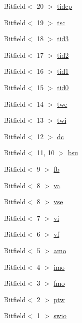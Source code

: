 \begin{DoxyCompactItemize}
\item 
Bitfield$<$ 20 $>$ \hyperlink{namespaceArmISA_a684303242e2beae8a4046dca91e1df6b}{tidcp}
\item 
Bitfield$<$ 19 $>$ \hyperlink{namespaceArmISA_a5a008ae3ad3257e839dc31ba7bdc1df7}{tsc}
\item 
Bitfield$<$ 18 $>$ \hyperlink{namespaceArmISA_aa514bf6204c77beeed1d6f468b8865f7}{tid3}
\item 
Bitfield$<$ 17 $>$ \hyperlink{namespaceArmISA_aebbc67d7831a7b50b370258ac57ad317}{tid2}
\item 
Bitfield$<$ 16 $>$ \hyperlink{namespaceArmISA_aa1f6aecfe0e633e7535bdb7b4cc3584b}{tid1}
\item 
Bitfield$<$ 15 $>$ \hyperlink{namespaceArmISA_a5bf37dce5d509ce8e379adc8fc652141}{tid0}
\item 
Bitfield$<$ 14 $>$ \hyperlink{namespaceArmISA_adb142adb9c0315377c60149b67f7cfcd}{twe}
\item 
Bitfield$<$ 13 $>$ \hyperlink{namespaceArmISA_a9e591706ecc2da9dc64d55046584f5bc}{twi}
\item 
Bitfield$<$ 12 $>$ \hyperlink{namespaceArmISA_a5d751d77bf3f535d2f771834447a85af}{dc}
\item 
Bitfield$<$ 11, 10 $>$ \hyperlink{namespaceArmISA_a7851f6d2ecd6b9a4629cdd8e683a1023}{bsu}
\item 
Bitfield$<$ 9 $>$ \hyperlink{namespaceArmISA_a55199aded75e222efb70312950df7958}{fb}
\item 
Bitfield$<$ 8 $>$ \hyperlink{namespaceArmISA_a441099e13f407fadb6bcb0447107de87}{va}
\item 
Bitfield$<$ 8 $>$ \hyperlink{namespaceArmISA_a2d1b598d80ef54b54443d080a40dfaa3}{vse}
\item 
Bitfield$<$ 7 $>$ \hyperlink{namespaceArmISA_a898206d2c5d580516df9f494a30b9e42}{vi}
\item 
Bitfield$<$ 6 $>$ \hyperlink{namespaceArmISA_ad9ff00a40b5b03b97c7c2fb4002fa660}{vf}
\item 
Bitfield$<$ 5 $>$ \hyperlink{namespaceArmISA_a8c8b696b51300e4ffb3f2529e842920e}{amo}
\item 
Bitfield$<$ 4 $>$ \hyperlink{namespaceArmISA_a59a7b4da364609a5addbe4baf07157db}{imo}
\item 
Bitfield$<$ 3 $>$ \hyperlink{namespaceArmISA_ab8c84f1c210fa2c8380c137d84e37ef4}{fmo}
\item 
Bitfield$<$ 2 $>$ \hyperlink{namespaceArmISA_a06de921b20e1aa5231839f642304237a}{ptw}
\item 
Bitfield$<$ 1 $>$ \hyperlink{namespaceArmISA_a3a2846cc814eff4788e11c0367337e29}{swio}

\end{DoxyCompactItemize}
